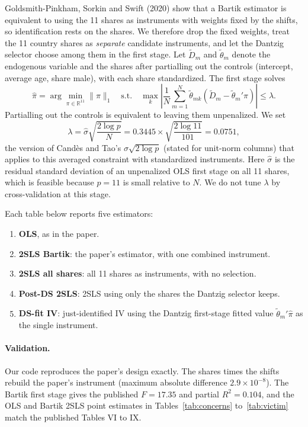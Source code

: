 \documentclass[11pt]{article}
\begin{document}
Goldsmith-Pinkham, Sorkin and Swift (2020) show that a Bartik estimator is equivalent to
using the 11 shares as instruments with weights fixed by the shifts, so identification
rests on the shares. We therefore drop the fixed weights, treat the 11 country shares as
\emph{separate} candidate instruments, and let the Dantzig selector choose among them in
the first stage. Let $\tilde{D}_m$ and $\tilde{\theta}_m$ denote the endogenous variable and
the shares after partialling out the controls (intercept, average age, share male), with
each share standardized. The first stage solves
\[
  \hat{\pi} = \arg\min_{\pi \in \mathbb{R}^{11}} \|\pi\|_1
  \quad \text{s.t.} \quad
  \max_{k}\left|\frac{1}{N}\sum_{m=1}^{N} \tilde{\theta}_{mk}\left(\tilde{D}_m - \tilde{\theta}_m'\pi\right)\right| \le \lambda .
\]
Partialling out the controls is equivalent to leaving them unpenalized. We set
\[
  \lambda = \hat{\sigma}\sqrt{\frac{2\log p}{N}} = 0.3445 \times \sqrt{\frac{2 \log 11}{101}} = 0.0751,
\]
the version of Candès and Tao's $\sigma\sqrt{2\log p}$ (stated for unit-norm columns) that
applies to this averaged constraint with standardized instruments. Here
$\hat{\sigma}$ is the residual standard deviation of an unpenalized OLS first stage on all
11 shares, which is feasible because $p = 11$ is small relative to $N$. We do not tune
$\lambda$ by cross-validation at this stage.

Each table below reports five estimators:
\begin{enumerate}
  \item \textbf{OLS}, as in the paper.
  \item \textbf{2SLS Bartik}: the paper's estimator, with one combined instrument.
  \item \textbf{2SLS all shares}: all 11 shares as instruments, with no selection.
  \item \textbf{Post-DS 2SLS}: 2SLS using only the shares the Dantzig selector keeps.
  \item \textbf{DS-fit IV}: just-identified IV using the Dantzig first-stage fitted value
        $\tilde{\theta}_m'\hat{\pi}$ as the single instrument.
\end{enumerate}

\paragraph{Validation.} Our code reproduces the paper's design exactly. The shares times
the shifts rebuild the paper's instrument (maximum absolute difference
$2.9 \times 10^{-8}$). The Bartik first stage gives the published $F = 17.35$ and partial
$R^2 = 0.104$, and the OLS and Bartik 2SLS point estimates in Tables~\ref{tab:concerns}
to~\ref{tab:victim} match the published Tables VI to IX.
\end{document}
